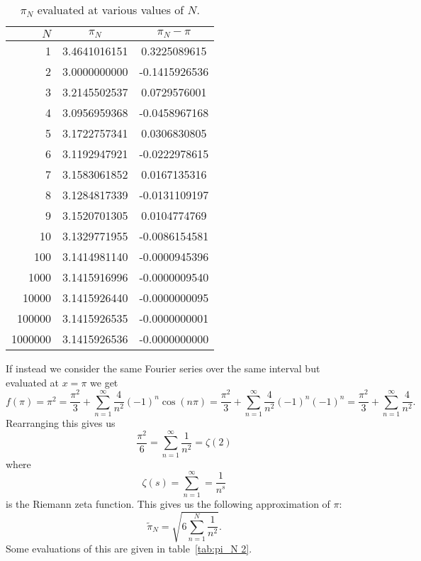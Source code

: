 \documentclass[a4paper]{article}
\begin{document}
    \begin{table}[ht]
        \centering
        \begin{tabular}{rcc}
            \hline
            \(N\) & \(\pi_N\) & \(\pi_N - \pi\)\\\hline
            1 & 3.4641016151 & 0.3225089615\\
            2 & 3.0000000000 & -0.1415926536\\
            3 & 3.2145502537 & 0.0729576001\\
            4 & 3.0956959368 & -0.0458967168\\
            5 & 3.1722757341 & 0.0306830805\\
            6 & 3.1192947921 & -0.0222978615\\
            7 & 3.1583061852 & 0.0167135316\\
            8 & 3.1284817339 & -0.0131109197\\
            9 & 3.1520701305 & 0.0104774769\\
            10 & 3.1329771955 & -0.0086154581\\
            100 & 3.1414981140 & -0.0000945396\\
            1000 & 3.1415916996 & -0.0000009540\\
            10000 & 3.1415926440 & -0.0000000095\\
            100000 & 3.1415926535 & -0.0000000001\\
            1000000 & 3.1415926536 & -0.0000000000\\\hline
        \end{tabular}
        \caption{\(\pi_N\) evaluated at various values of \(N\).}
        \label{tab:pi_N}
    \end{table}
    If instead we consider the same Fourier series over the same interval but evaluated at \(x = \pi\) we get
    \[f(\pi) = \pi^2 = \frac{\pi^2}{3} + \sum_{n=1}^{\infty}\frac{4}{n^2}(-1)^n\cos(n\pi) = \frac{\pi^2}{3} + \sum_{n=1}^{\infty}\frac{4}{n^2}(-1)^n(-1)^n = \frac{\pi^2}{3} + \sum_{n=1}^{\infty}\frac{4}{n^2}.\]
    Rearranging this gives us
    \[\frac{\pi^2}{6} = \sum_{n=1}^{\infty}\frac{1}{n^2} = \zeta(2)\]
    where
    \[\zeta(s) = \sum_{n=1}^\infty = \frac{1}{n^s}\]
    is the Riemann zeta function.
    This gives us the following approximation of \(\pi\):
    \[\tilde{\pi}_N = \sqrt{6\sum_{n=1}^{N}\frac{1}{n^2}}.\]
    Some evaluations of this are given in table~\ref{tab:pi_N 2}.
\end{document}
